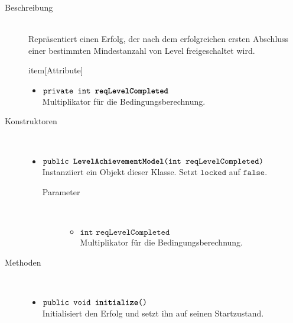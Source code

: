 \begin{description}
\item[Beschreibung] \hfill \\ Repräsentiert einen Erfolg, der nach dem erfolgreichen ersten Abschluss einer bestimmten Mindestanzahl von Level freigeschaltet wird.
	
item[Attribute] \hfill \\
	\vspace{-.8cm}
	\begin{itemize}
		\item $\texttt{private int \textbf{reqLevelCompleted}}$ \\ Multiplikator für die Bedingungsberechnung.
	\end{itemize}	
	
\item[Konstruktoren] \hfill \\
	\vspace{-.8cm}
	\begin{itemize}
		\item $\texttt{public \textbf{LevelAchievementModel}(int reqLevelCompleted)}$ \\ Instanziiert ein Objekt dieser Klasse. Setzt $\texttt{locked}$ auf $\texttt{false}$.
		\begin{description}
			\item[Parameter] \hfill \\
			\vspace{-.8cm}
			\begin{itemize}
				\item $\texttt{int reqLevelCompleted}$ \\ Multiplikator für die Bedingungsberechnung.
			\end{itemize}
		\end{description}
	\end{itemize}
	
\item[Methoden] \hfill \\
	\vspace{-.8cm}
	\begin{itemize}
		\item $\texttt{public void \textbf{initialize}()}$ \\ Initialisiert den Erfolg und setzt ihn auf seinen Startzustand.
		

\end{itemize}
\end{description}
